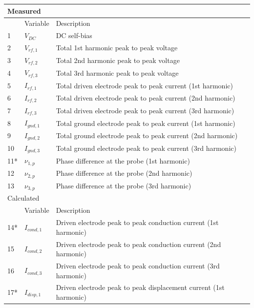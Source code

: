 \documentclass[12pt]{iopart}
\begin{document}
\begin{table}[]
    \centering
\begin{tabular}{|p{1cm}|p{2cm}|p{12.5cm}|}
        \multicolumn{3}{l}{Measured} \\ 
        \hline
        & Variable & Description\\ 
        \hline 
        1 & $V_{DC}$ & DC self-bias\\
        2 & $V_{rf,1}$ & Total 1st harmonic peak to peak voltage\\
        3 & $V_{rf,2}$ & Total 2nd harmonic peak to peak voltage\\
        4 & $V_{rf,3}$ & Total 3rd harmonic peak to peak voltage\\
        5 & $I_{rf,1}$ & Total driven electrode peak to peak current (1st harmonic)\\
        6 & $I_{rf,2}$ & Total driven electrode peak to peak current (2nd harmonic)\\
        7 & $I_{rf,3}$ & Total driven electrode peak to peak current (3rd harmonic)\\
        8 & $I_{gnd,1}$ & Total ground electrode peak to peak current (1st harmonic)\\
        9 & $I_{gnd,2}$ & Total ground electrode peak to peak current (2nd harmonic)\\
        10 & $I_{gnd,3}$ & Total ground electrode peak to peak current (3rd harmonic)\\
        11* & $\nu_{1,p}$ & Phase difference at the probe (1st harmonic) \\
        12 & $\nu_{2,p}$ & Phase difference at the probe (2nd harmonic) \\
        13 & $\nu_{3,p}$ & Phase difference at the probe (3rd harmonic) \\
        \hline \multicolumn{3}{l}{Calculated} \\ \hline
        & Variable & Description\\ 
        \hline 
        14* & $I_{cond,1}$ & Driven electrode peak to peak conduction current (1st harmonic) \\
        15 & $I_{cond,2}$ & Driven electrode peak to peak conduction current (2nd harmonic) \\
        16 & $I_{cond,3}$ & Driven electrode peak to peak conduction current (3rd harmonic) \\       
        17* & $I_{disp,1}$ & Driven electrode peak to peak displacement current (1st harmonic) \\     

\end{tabular}
\end{table}
\end{document}
